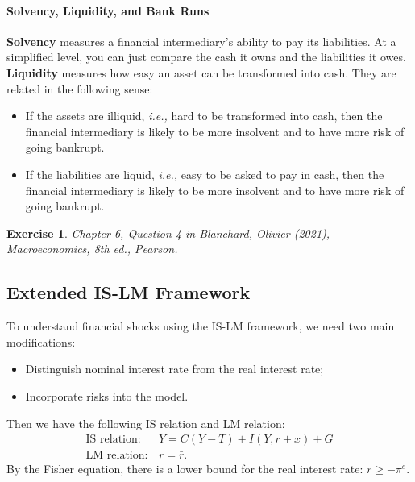 \documentclass[12pt]{article}
\newtheorem{exercise}{Exercise}
\begin{document}
\paragraph{Solvency, Liquidity, and Bank Runs}
\textbf{Solvency} measures a financial intermediary's ability to pay its liabilities. At a simplified level, you can just compare the cash it owns and the liabilities it owes. \textbf{Liquidity} measures how easy an asset can be transformed into cash. They are related in the following sense:
\begin{itemize}
    \item If the assets are illiquid, \textit{i.e.,} hard to be transformed into cash, then the financial intermediary is likely to be more insolvent and to have more risk of going bankrupt.
    \item If the liabilities are liquid, \textit{i.e.,} easy to be asked to pay in cash, then the financial intermediary is likely to be more insolvent and to have more risk of going bankrupt.
\end{itemize}

\begin{exercise}
    Chapter 6, Question 4 in Blanchard, Olivier (2021), \textit{Macroeconomics}, 8th ed., Pearson.
\end{exercise}

\subsection*{Extended IS-LM Framework}
To understand financial shocks using the IS-LM framework, we need two main modifications:
\begin{itemize}
    \item Distinguish nominal interest rate from the real interest rate;
    \item Incorporate risks into the model.
\end{itemize}
Then we have the following IS relation and LM relation:
\begin{align*}
    \text{IS relation}: &\, Y = C(Y-T) + I(Y, r+x) + G\\
    \text{LM relation}: &\, r = \bar{r}.
\end{align*}
By the Fisher equation, there is a lower bound for the real interest rate: $r \geq -\pi^e$.
\end{document}
